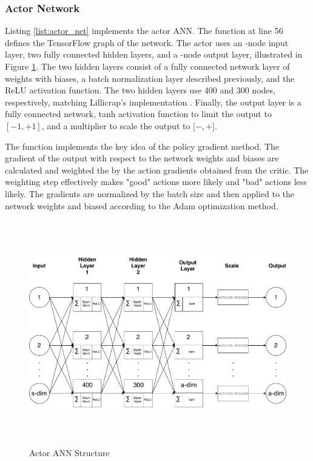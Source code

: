 \subsubsection{Actor Network}
Listing \ref{list:actor_net} implements the actor ANN. The function  at line 56 defines the TensorFlow graph of the network. The actor uses an -node input layer, two fully connected hidden layers, and a  -node output layer, illustrated in Figure \ref{fig:actor_net}. The two hidden layers consist of a fully connected network layer of weights with biases, a batch normalization layer described previously, and the ReLU activation function. The two hidden layers use 400 and 300 nodes, respectively, matching Lillicrap's implementation \cite{lillicrap_2016}. Finally, the output layer is a fully connected network, tanh activation function to limit the output to $[-1,+1]$, and a multiplier to scale the output to $[-$$,+$$]$.

The  function implements the key idea of the policy gradient method. The gradient of the output with respect to the network weights and biases are calculated and weighted the by the action gradients obtained from the critic. The weighting step effectively makes "good" actions more likely and "bad" actions less likely. The gradients are normalized by the batch size and then applied to the network weights and biased according to the Adam optimization method. 
\begin{figure}[H]   %
	\centering \includegraphics[width=6in, height=3.85in, keepaspectratio]{figures/actor_net.pdf}
	\caption{Actor ANN Structure}\label{fig:actor_net}
\end{figure}

